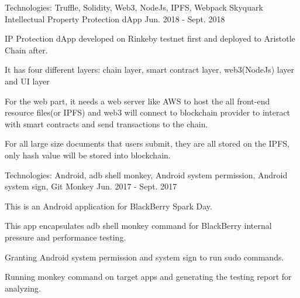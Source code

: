 \begin{cventries}

 
  \cventry
    {Technologies: \quad Truffle, Solidity, Web3, NodeJs, IPFS, Webpack
    }
    {Skyquark Intellectual Property Protection dApp}
    {}
    {Jun. 2018 - Sept. 2018}
    {
      \begin{cvitems}
        \item {IP Protection dApp developed on Rinkeby testnet first and deployed to Aristotle Chain after.}
        \item {It has four different layers: chain layer, smart contract layer, web3(NodeJs) layer and UI layer}
        \item {For the web part, it needs a web server like AWS to host the all front-end resource files(or IPFS) and web3 will connect to blockchain provider to interact with smart contracts and send transactions to the chain.}
        \item {For all large size documents that users submit, they are all stored on the IPFS, only hash value will be stored into blockchain.}
      \end{cvitems}
    }

  \cventry
    {Technologies: \quad Android, adb shell monkey, Android system permission, Android system sign, Git}
    {Monkey}
    {}
    {Jun. 2017 - Sept. 2017}
    {
      \begin{cvitems}
        \item {This is an Android application for BlackBerry Spark Day.}
        \item {This app encapsulates adb shell monkey command for BlackBerry internal pressure and performance testing.}
        \item {Granting Android system permission and system sign to run sudo commands.}
        \item {Running monkey command on target apps and generating the testing report for analyzing.}
      \end{cvitems}
    }
  

\end{cventries}
